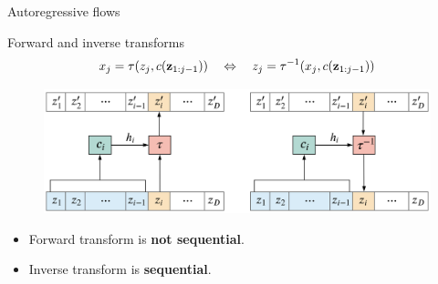 \documentclass{beamer}
\begin{document}
\begin{frame}{Autoregressive flows}
	\begin{block}{Forward and inverse transforms}
		\[
		x_j = \tau (z_j, c(\mathbf{z}_{1:j-1})) \quad \Leftrightarrow \quad z_j = \tau^{-1} (x_j, c(\mathbf{z}_{1:j-1}))
		\]
		\begin{figure}
			\includegraphics[width=\linewidth]{figs/autoregressive_flow}
		\end{figure}
	\end{block}
	\begin{itemize}
		\item Forward transform is \textbf{not sequential}.
		\item Inverse transform is \textbf{sequential}.
	\end{itemize}
	
\end{frame}
\end{document}
